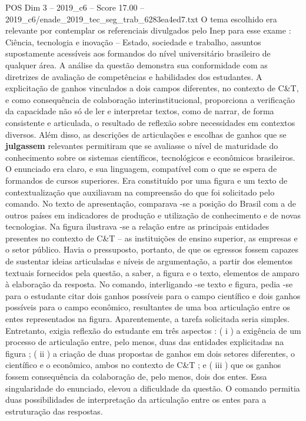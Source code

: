 \begin{textsample}{POS Dim 3 – 2019\_c6 – Score 17.00 – 2019\_c6/enade\_2019\_tec\_seg\_trab\_6283ea4ed7.txt}
O tema escolhido era relevante por contemplar os referenciais divulgados pelo Inep para esse exame : Ciência, tecnologia e inovação – Estado, sociedade e trabalho, assuntos supostamente acessíveis aos formandos do nível universitário brasileiro de qualquer área.
A análise da questão demonstra sua conformidade com as diretrizes de avaliação de competências e habilidades dos estudantes.
A explicitação de ganhos vinculados a dois campos diferentes, no contexto de C\&T, e como consequência de colaboração interinstitucional, proporciona a verificação da capacidade não só de ler e interpretar textos, como de narrar, de forma consistente e articulada, o resultado de reflexão sobre necessidades em contextos diversos.
Além disso, as descrições de articulações e escolhas de ganhos que se \textbf{julgassem} relevantes permitiram que se avaliasse o nível de maturidade do conhecimento sobre os sistemas científicos, tecnológicos e econômicos brasileiros.
O enunciado era claro, e sua linguagem, compatível com o que se espera de formandos de cursos superiores.
Era constituído por uma figura e um texto de contextualização que auxiliavam na compreensão do que foi solicitado pelo comando.
No texto de apresentação, comparava -se a posição do Brasil com a de outros países em indicadores de produção e utilização de conhecimento e de novas tecnologias.
Na figura ilustrava -se a relação entre as principais entidades presentes no contexto de C\&T – as instituições de ensino superior, as empresas e o setor público.
Havia o pressuposto, portanto, de que os egressos fossem capazes de sustentar ideias articuladas e níveis de argumentação, a partir dos elementos textuais fornecidos pela questão, a saber, a figura e o texto, elementos de amparo à elaboração da resposta.
No comando, interligando -se texto e figura, pedia -se para o estudante citar dois ganhos possíveis para o campo científico e dois ganhos possíveis para o campo econômico, resultantes de uma boa articulação entre os entes representados na figura.
Aparentemente, a tarefa solicitada seria simples.
Entretanto, exigia reflexão do estudante em três aspectos : ( i ) a exigência de um processo de articulação entre, pelo menos, duas das entidades explicitadas na figura ; ( ii ) a criação de duas propostas de ganhos em dois setores diferentes, o científico e o econômico, ambos no contexto de C\&T ; e ( iii ) que os ganhos fossem consequência da colaboração de, pelo menos, dois dos entes.
Essa singularidade do enunciado, elevou a dificuldade da questão.
O comando permitia duas possibilidades de interpretação da articulação entre os entes para a estruturação das respostas.

\end{textsample}
